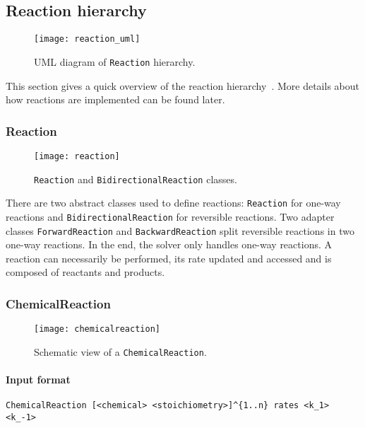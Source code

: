 
\subsection{Reaction hierarchy}

\begin{figure}[!h]
  \centering
  \texttt{[image: reaction\_uml]}
  \caption{UML diagram of \texttt{Reaction} hierarchy.}
\label{fig:reaction_uml}
\end{figure}

This section gives a quick overview of the reaction hierarchy~.
More details about how reactions are implemented can be found later.

\subsubsection{Reaction}

\begin{figure}[!h]
  \centering
  \texttt{[image: reaction]}
  \caption{\texttt{Reaction} and \texttt{BidirectionalReaction} classes.}
\label{fig:reaction}
\end{figure}

There are two abstract classes used to define reactions:
\texttt{Reaction} for one-way reactions and \texttt{BidirectionalReaction} for reversible reactions.
Two adapter classes \texttt{ForwardReaction} and \texttt{BackwardReaction}
split reversible reactions in two one-way reactions.
In the end, the solver only handles one-way reactions.
A reaction can necessarily be performed,
its rate updated and accessed and is composed of reactants and products.

\subsubsection{ChemicalReaction}

\begin{figure}[!h]
  \centering
  \texttt{[image: chemicalreaction]}
  \caption{Schematic view of a \texttt{ChemicalReaction}.}
\label{fig:chemical_reaction}
\end{figure}

\paragraph{Input format}
\begin{verbatim}
ChemicalReaction [<chemical> <stoichiometry>]^{1..n} rates <k_1> <k_-1>
\end{verbatim}

